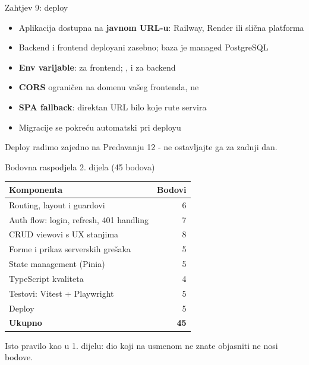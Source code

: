 \begin{frame}{Zahtjev 9: deploy}
\begin{itemize}
  \item Aplikacija dostupna na \textbf{javnom URL-u}: Railway, Render ili slična platforma
  \item Backend i frontend deployani zasebno; baza je managed PostgreSQL
  \item \textbf{Env varijable}:  za frontend; ,  i  za backend
  \item \textbf{CORS} ograničen na domenu vašeg frontenda, ne \codefile{*}
  \item \textbf{SPA fallback}: direktan URL bilo koje rute servira 
  \item Migracije se pokreću automatski pri deployu
\end{itemize}

\vspace{0.4em}
Deploy radimo zajedno na Predavanju 12 - ne ostavljajte ga za zadnji dan.
\end{frame}

\begin{frame}{Bodovna raspodjela 2. dijela (45 bodova)}
\begin{tabular}{@{}lr@{}}
  \toprule
  \textbf{Komponenta} & \textbf{Bodovi} \\
  \midrule
  Routing, layout i guardovi & 6 \\
  Auth flow: login, refresh, 401 handling & 7 \\
  CRUD viewovi s UX stanjima & 8 \\
  Forme i prikaz serverskih grešaka & 5 \\
  State management (Pinia) & 5 \\
  TypeScript kvaliteta & 4 \\
  Testovi: Vitest + Playwright & 5 \\
  Deploy & 5 \\
  \midrule
  \textbf{Ukupno} & \textbf{45} \\
  \bottomrule
\end{tabular}

\vspace{0.4em}
Isto pravilo kao u 1. dijelu: dio koji na usmenom ne znate objasniti ne nosi bodove.
\end{frame}

